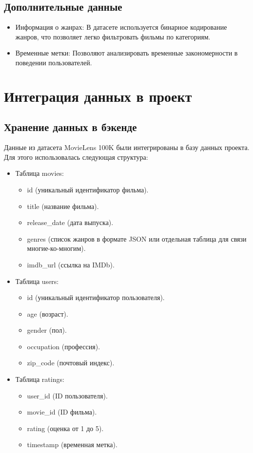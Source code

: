 \subsection*{Дополнительные данные}
\begin{itemize}
    \item Информация о жанрах: В датасете используется бинарное кодирование жанров, что позволяет легко фильтровать фильмы по категориям.
    \item Временные метки: Позволяют анализировать временные закономерности в поведении пользователей.
\end{itemize}

\section{Интеграция данных в проект}

\subsection*{Хранение данных в бэкенде}
Данные из датасета MovieLens 100K были интегрированы в базу данных проекта. Для этого использовалась следующая структура:

\begin{itemize}
    \item Таблица movies:
        \begin{itemize}
            \item id (уникальный идентификатор фильма).
            \item title (название фильма).
            \item release\_date (дата выпуска).
            \item genres (список жанров в формате JSON или отдельная таблица для связи многие-ко-многим).
            \item imdb\_url (ссылка на IMDb).
        \end{itemize}
    \item Таблица users:
        \begin{itemize}
            \item id (уникальный идентификатор пользователя).
            \item age (возраст).
            \item gender (пол).
            \item occupation (профессия).
            \item zip\_code (почтовый индекс).
        \end{itemize}
    \item Таблица ratings:
        \begin{itemize}
            \item user\_id (ID пользователя).
            \item movie\_id (ID фильма).
            \item rating (оценка от 1 до 5).
            \item timestamp (временная метка).
        \end{itemize}
\end{itemize}

